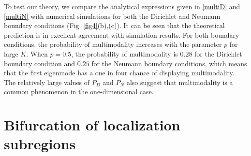 \documentclass[a4paper,11pt]{article}
\begin{document}
To test our theory, we compare the analytical expressions given in \eqref{multiD} and \eqref{multiN} with numerical simulations for both the Dirichlet and Neumann boundary conditions (Fig. \ref{fig4}(b),(c)).
It can be seen that the theoretical prediction is in excellent agreement with simulation results. For both boundary conditions, the probability of multimodality increases with the parameter $p$ for large $K$. When $p = 0.5$, the probability of multimodality is $0.28$ for the Dirichlet boundary condition and $0.25$ for the Neumann boundary conditions, which means that the first eigenmode has a one in four chance of displaying multimodality. The relatively large values of $P_D$ and $P_N$ also suggest that multimodality is a common phenomenon in the one-dimensional case.


\section{Bifurcation of localization subregions}\label{transition}
\end{document}
